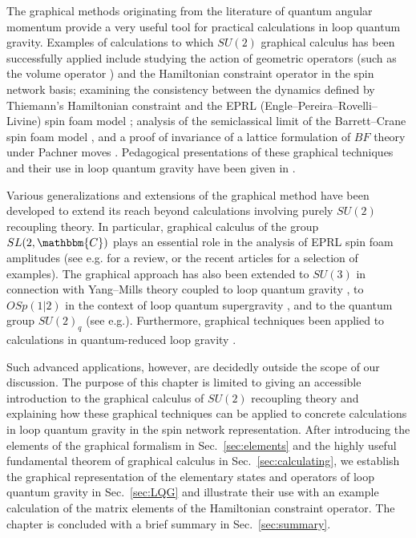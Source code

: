 \documentclass[graybox, secnum]{svmult}
\makeatletter
\newcommand{\eg}{e.g.\@\xspace}
\newcommand{\C}{\mathbbm{C}}
\makeatother
\begin{document}
The graphical methods originating from the literature of quantum angular momentum provide a very useful tool for practical calculations in loop quantum gravity. Examples of calculations to which $SU(2)$ graphical calculus has been successfully applied include studying the action of geometric operators (such as the volume operator \cite{Rovelli:1994ge,Ashtekar:1997fb}) \cite{DePietri:1996tvo, Bianchi:2008es, Yang:2015wka,Yang:2016kia, Yang:2019xms} and the Hamiltonian constraint operator \cite{Alesci:2010gb, Alesci:2013kpa,Gaul:2000ba,Alesci:2015wla,Makinen:2019} in the spin network basis; examining the consistency \cite{Yang:2021den, Alesci:2011ia,Thiemann:2013lka} between the dynamics defined by Thiemann's Hamiltonian constraint \cite{Thiemann:1996aw} and the EPRL (Engle--Pereira--Rovelli--Livine) spin foam model \cite{Engle:2007wy,Freidel:2007py,Kaminski:2009fm}; analysis of the semiclassical limit of the Barrett--Crane spin foam model \cite{Alesci:2007tx}, and a proof of invariance of a lattice formulation of $BF$ theory under Pachner moves \cite{Kawamoto:1999jv}. Pedagogical presentations of these graphical techniques and their use in loop quantum gravity have been given in \cite{Martin-Dussaud:2019ypf,Makinen:2019rou}.

Various generalizations and extensions of the graphical method have been developed to extend its reach beyond calculations involving purely $SU(2)$ recoupling theory. In particular, graphical calculus of the group $SL(2,\C)$ plays an essential role in the analysis of EPRL spin foam amplitudes (see \eg \cite{Perez:2012wv} for a review, or the recent articles \cite{Dona:2020,Dona:2022,Frisoni:2022} for a selection of examples). The graphical approach has also been extended to $SU(3)$ in connection with Yang--Mills theory coupled to loop quantum gravity \cite{Liegener:2016mgc}, to $OSp(1|2)$ in the context of loop quantum supergravity \cite{Ling:1999}, and to the quantum group $SU(2)_q$ (see \eg \cite{Borissov:1995, Dittrich:2016}). Furthermore, graphical techniques been applied to calculations in quantum-reduced loop gravity \cite{Alesci:2013xd,Alesci:2014c}.

Such advanced applications, however, are decidedly outside the scope of our discussion. The purpose of this chapter is limited to giving an accessible introduction to the graphical calculus of $SU(2)$ recoupling theory and explaining how these graphical techniques can be applied to concrete calculations in loop quantum gravity in the spin network representation. After introducing the elements of the graphical formalism in Sec.~\ref{sec:elements} and the highly useful fundamental theorem of graphical calculus in Sec.~\ref{sec:calculating}, we establish the graphical representation of the elementary states and operators of loop quantum gravity in Sec.~\ref{sec:LQG} and illustrate their use with an example calculation of the matrix elements of the Hamiltonian constraint operator. The chapter is concluded with a brief summary in Sec.~\ref{sec:summary}.
\end{document}
